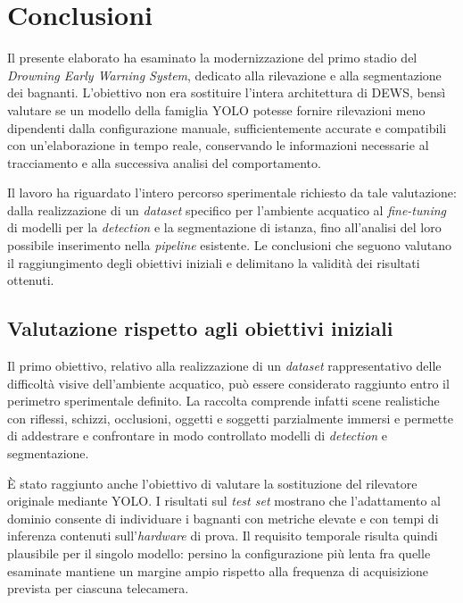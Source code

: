 \chapter{Conclusioni}

Il presente elaborato ha esaminato la modernizzazione del primo stadio del \textit{Drowning Early Warning System}, dedicato alla rilevazione e alla segmentazione dei bagnanti. L'obiettivo non era sostituire l'intera architettura di DEWS, bensì valutare se un modello della famiglia YOLO potesse fornire rilevazioni meno dipendenti dalla configurazione manuale, sufficientemente accurate e compatibili con un'elaborazione in tempo reale, conservando le informazioni necessarie al tracciamento e alla successiva analisi del comportamento.

Il lavoro ha riguardato l'intero percorso sperimentale richiesto da tale valutazione: dalla realizzazione di un \textit{dataset} specifico per l'ambiente acquatico al \textit{fine-tuning} di modelli per la \textit{detection} e la segmentazione di istanza, fino all'analisi del loro possibile inserimento nella \textit{pipeline} esistente. Le conclusioni che seguono valutano il raggiungimento degli obiettivi iniziali e delimitano la validità dei risultati ottenuti.

\section{Valutazione rispetto agli obiettivi iniziali}

Il primo obiettivo, relativo alla realizzazione di un \textit{dataset} rappresentativo delle difficoltà visive dell'ambiente acquatico, può essere considerato raggiunto entro il perimetro sperimentale definito. La raccolta comprende infatti scene realistiche con riflessi, schizzi, occlusioni, oggetti e soggetti parzialmente immersi e permette di addestrare e confrontare in modo controllato modelli di \textit{detection} e segmentazione.

È stato raggiunto anche l'obiettivo di valutare la sostituzione del rilevatore originale mediante YOLO. I risultati sul \textit{test set} mostrano che l'adattamento al dominio consente di individuare i bagnanti con metriche elevate e con tempi di inferenza contenuti sull'\textit{hardware} di prova. Il requisito temporale risulta quindi plausibile per il singolo modello: persino la configurazione più lenta fra quelle esaminate mantiene un margine ampio rispetto alla frequenza di acquisizione prevista per ciascuna telecamera.

